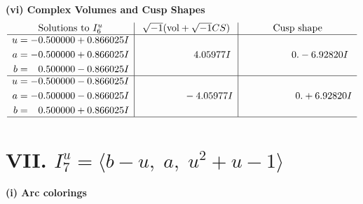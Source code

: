 \documentclass[1p]{elsarticle_modified}
\theoremstyle{definition}
\newcommand{\I}{\sqrt{-1}}
\begin{document}
\newpage\flushleft \textbf{(vi) Complex Volumes and Cusp Shapes}
$$\begin{array}{c|c|c}  
\text{Solutions to }I^u_{6}& \I (\text{vol} + \sqrt{-1}CS) & \text{Cusp shape}\\
 \hline 
\begin{aligned}
u &= -0.500000 + 0.866025 I \\
a &= -0.500000 + 0.866025 I \\
b &= \phantom{-}0.500000 - 0.866025 I\end{aligned}
 & \phantom{-0.000000 -}4.05977 I & \phantom{-0.000000 } 0. - 6.92820 I \\ \hline\begin{aligned}
u &= -0.500000 - 0.866025 I \\
a &= -0.500000 - 0.866025 I \\
b &= \phantom{-}0.500000 + 0.866025 I\end{aligned}
 & \phantom{-0.000000 } -4.05977 I & \phantom{-0.000000 -}0. + 6.92820 I\\
 \hline 
 \end{array}$$\newpage\newpage\renewcommand{\arraystretch}{1}
\centering \section*{VII. $I^u_{7}= \langle b- u,\;a,\;u^2+u-1 \rangle$}
\flushleft \textbf{(i) Arc colorings}\\
\end{document}
